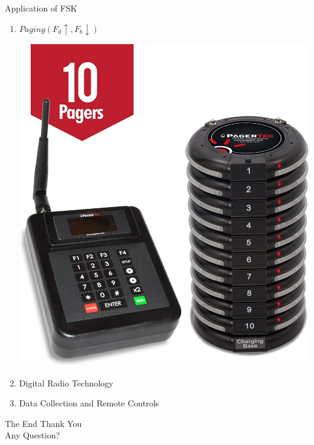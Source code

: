 \documentclass{beamer}
\begin{document}
	\begin{frame}{Application of FSK}
		\begin{enumerate}
			\item $Paging (F_d\uparrow , F_b\downarrow)	$	 \\	
			\begin{center}
				\includegraphics[scale=0.05]{paging.jpg}
			\end{center}
			
			\item Digital Radio Technology
			\item Data Collection and Remote Controls
		\end{enumerate}
	\end{frame}
	
	
	\begin{frame}{The End}
		\centering
		\Huge Thank You \\
		\Large Any Question?
	\end{frame}
	
	
\end{document}

